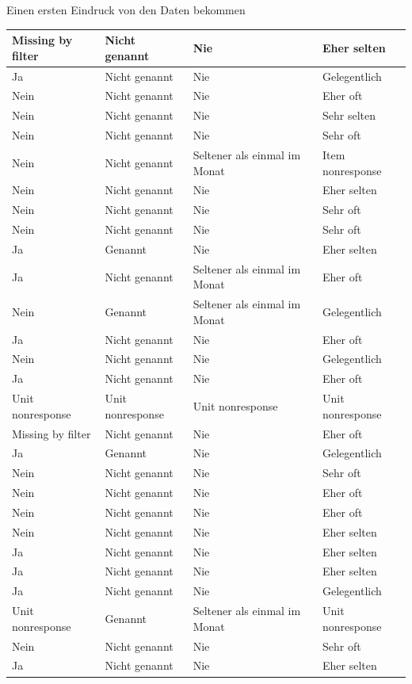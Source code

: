 \documentclass[ignorenonframetext,]{beamer}
\begin{document}
\begin{frame}{Einen ersten Eindruck von den Daten bekommen}
\begin{tabular}{l|l|l|l}
Missing by filter & Nicht genannt & Nie & Eher selten\\
\hline
Ja & Nicht genannt & Nie & Gelegentlich\\
\hline
Nein & Nicht genannt & Nie & Eher oft\\
\hline
Nein & Nicht genannt & Nie & Sehr selten\\
\hline
Nein & Nicht genannt & Nie & Sehr oft\\
\hline
Nein & Nicht genannt & Seltener als einmal im Monat & Item nonresponse\\
\hline
Nein & Nicht genannt & Nie & Eher selten\\
\hline
Nein & Nicht genannt & Nie & Sehr oft\\
\hline
Nein & Nicht genannt & Nie & Sehr oft\\
\hline
Ja & Genannt & Nie & Eher selten\\
\hline
Ja & Nicht genannt & Seltener als einmal im Monat & Eher oft\\
\hline
Nein & Genannt & Seltener als einmal im Monat & Gelegentlich\\
\hline
Ja & Nicht genannt & Nie & Eher oft\\
\hline
Nein & Nicht genannt & Nie & Gelegentlich\\
\hline
Ja & Nicht genannt & Nie & Eher oft\\
\hline
Unit nonresponse & Unit nonresponse & Unit nonresponse & Unit nonresponse\\
\hline
Missing by filter & Nicht genannt & Nie & Eher oft\\
\hline
Ja & Genannt & Nie & Gelegentlich\\
\hline
Nein & Nicht genannt & Nie & Sehr oft\\
\hline
Nein & Nicht genannt & Nie & Eher oft\\
\hline
Nein & Nicht genannt & Nie & Eher oft\\
\hline
Nein & Nicht genannt & Nie & Eher selten\\
\hline
Ja & Nicht genannt & Nie & Eher selten\\
\hline
Ja & Nicht genannt & Nie & Eher selten\\
\hline
Ja & Nicht genannt & Nie & Gelegentlich\\
\hline
Unit nonresponse & Genannt & Seltener als einmal im Monat & Unit nonresponse\\
\hline
Nein & Nicht genannt & Nie & Sehr oft\\
\hline
Ja & Nicht genannt & Nie & Eher selten\\

\end{tabular}
\end{frame}
\end{document}
